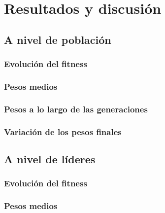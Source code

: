 \chapter{Resultados y discusión} \label{chap:resultados}

\section{A nivel de población} \label{sec:a_nivel_de_poblacion}


\subsection{Evolución del fitness} \label{sec:evolucion_fitness_poblacion}


\subsection{Pesos medios} \label{sec:pesos_medios_poblacion}


\subsection{Pesos a lo largo de las generaciones} \label{sec:pesos_a_lo_largo_generaciones_poblacion}


\subsection{Variación de los pesos finales} \label{sec:variacion_pesos_finales_poblacion}


\section{A nivel de líderes} \label{sec:a_nivel_de_lideres}


\subsection{Evolución del fitness} \label{sec:evolucion_fitness_lideres}


\subsection{Pesos medios} \label{sec:pesos_medios_lideres}


